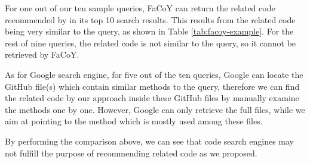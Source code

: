 For one out of our ten sample queries, {\ttt FaCoY} can return the related code recommended by {\tool} in its top 10 search results. This results from the related code being very similar to the query, as shown in Table \ref{tab:facoy-example}. For the rest of nine queries, the related code is not similar to the query, so it cannot be retrieved by {\ttt FaCoY}.

As for Google search engine, for five out of the ten queries, Google can locate the GitHub file(s) which contain similar methods to the query, therefore we can find the related code by our approach inside these GitHub files by manually examine the methods one by one. However, Google can only retrieve the full files, while we aim at pointing to the method which is mostly used among these files. 

By performing the comparison above, we can see that code search engines may not fulfill the purpose of recommending related code as we proposed.
